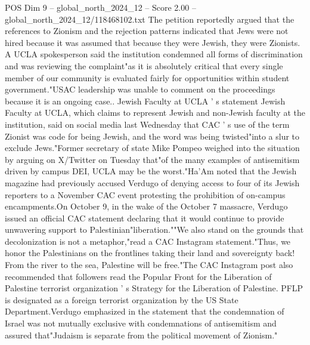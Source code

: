 \begin{textsample}{POS Dim 9 – global\_north\_2024\_12 – Score 2.00 – global\_north\_2024\_12/118468102.txt}
The petition reportedly argued that the references to Zionism and the rejection patterns indicated that Jews were not hired because it was assumed that because they were Jewish, they were Zionists.
A UCLA spokesperson said the institution condemned all forms of discrimination and was reviewing the complaint"as it is absolutely critical that every single member of our community is evaluated fairly for opportunities within student government."USAC leadership was unable to comment on the proceedings because it is an ongoing case..
Jewish Faculty at UCLA ' s statement Jewish Faculty at UCLA, which claims to represent Jewish and non-Jewish faculty at the institution, said on social media last Wednesday that CAC ' s use of the term Zionist was code for being Jewish, and the word was being twisted"into a slur to exclude Jews."Former secretary of state Mike Pompeo weighed into the situation by arguing on X/Twitter on Tuesday that"of the many examples of antisemitism driven by campus DEI, UCLA may be the worst."Ha'Am noted that the Jewish magazine had previously accused Verdugo of denying access to four of its Jewish reporters to a November CAC event protesting the prohibition of on-campus encampments.On October 9, in the wake of the October 7 massacre, Verdugo issued an official CAC statement declaring that it would continue to provide unwavering support to Palestinian"liberation.""We also stand on the grounds that decolonization is not a metaphor,"read a CAC Instagram statement."Thus, we honor the Palestinians on the frontlines taking their land and sovereignty back!
From the river to the sea, Palestine will be free."The CAC Instagram post also recommended that followers read the Popular Front for the Liberation of Palestine terrorist organization ' s Strategy for the Liberation of Palestine.
PFLP is designated as a foreign terrorist organization by the US State Department.Verdugo emphasized in the statement that the condemnation of Israel was not mutually exclusive with condemnations of antisemitism and assured that"Judaism is separate from the political movement of Zionism."

\end{textsample}
